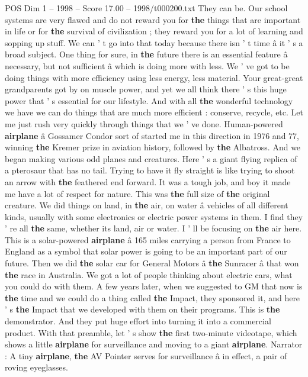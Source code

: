 \begin{textsample}{POS Dim 1 – 1998 – Score 17.00 – 1998/t000200.txt}
They can be.
Our school systems are very flawed and do not reward you for \textbf{the} things that are important in life or for \textbf{the} survival of civilization ; they reward you for a lot of learning and sopping up stuff.
We can ' t go into that today because there isn ' t time â it ' s a broad subject.
One thing for sure, in \textbf{the} future there is an essential feature â necessary, but not sufficient â which is doing more with less.
We ' ve got to be doing things with more efficiency using less energy, less material.
Your great-great grandparents got by on muscle power, and yet we all think there ' s this huge power that ' s essential for our lifestyle.
And with all \textbf{the} wonderful technology we have we can do things that are much more efficient : conserve, recycle, etc.
Let me just rush very quickly through things that we ' ve done.
Human-powered \textbf{airplane} â Gossamer Condor sort of started me in this direction in 1976 and 77, winning \textbf{the} Kremer prize in aviation history, followed by \textbf{the} Albatross.
And we began making various odd planes and creatures.
Here ' s a giant flying replica of a pterosaur that has no tail.
Trying to have it fly straight is like trying to shoot an arrow with \textbf{the} feathered end forward.
It was a tough job, and boy it made me have a lot of respect for nature.
This was \textbf{the} full size of \textbf{the} original creature.
We did things on land, in \textbf{the} air, on water â vehicles of all different kinds, usually with some electronics or electric power systems in them.
I find they ' re all \textbf{the} same, whether its land, air or water.
I ' ll be focusing on \textbf{the} air here.
This is a solar-powered \textbf{airplane} â 165 miles carrying a person from France to England as a symbol that solar power is going to be an important part of our future.
Then we did \textbf{the} solar car for General Motors â \textbf{the} Sunracer â that won \textbf{the} race in Australia.
We got a lot of people thinking about electric cars, what you could do with them.
A few years later, when we suggested to GM that now is \textbf{the} time and we could do a thing called \textbf{the} Impact, they sponsored it, and here ' s \textbf{the} Impact that we developed with them on their programs.
This is \textbf{the} demonstrator.
And they put huge effort into turning it into a commercial product.
With that preamble, let ' s show \textbf{the} first two-minute videotape, which shows a little \textbf{airplane} for surveillance and moving to a giant \textbf{airplane}.
Narrator : A tiny \textbf{airplane}, \textbf{the} AV Pointer serves for surveillance â in effect, a pair of roving eyeglasses.

\end{textsample}
